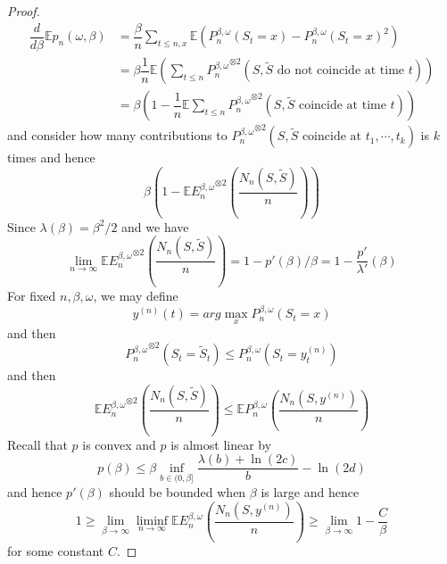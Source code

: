 \begin{proof}
    \[
    \begin{aligned}
    \dfrac{d}{d\beta}\mathbb{E}p_n(\omega,\beta) &= \dfrac{\beta}{n} \sum\limits_{t\leq n, x} \mathbb{E}(P_n^{\beta,\omega}(S_t = x)-P_n^{\beta,\omega}(S_t = x)^2) \\
    &=\beta\dfrac{1}{n}\mathbb{E}(\sum\limits_{t\leq n} {P_n^{\beta,\omega}}^{\otimes 2}(S,\tilde{S}\text{ do not coincide at time }t)) \\
    & = \beta(1 - \dfrac{1}{n}\mathbb{E}\sum\limits_{t\leq n}{ P_n^{\beta,\omega}}^{\otimes 2}(S,\tilde{S}\text{ coincide at time }t))   
    \end{aligned}
    \]
    and consider how many contributions to ${P_n^{\beta,\omega}}^{\otimes 2}(S,\tilde{S}\text{ coincide at }t_1,\cdots,t_k)$ is $k$ times and hence
    \[
    \beta\left(1 - \mathbb{E}{ E_n^{\beta,\omega}}^{\otimes 2}\left(\dfrac{N_n(S,\tilde{S})}{n}\right)\right)
    \]
    Since $\lambda(\beta) = \beta^2/2$ and we have
    \[
    \lim_{n\to\infty}\mathbb{E}{E_n^{\beta,\omega}}^{\otimes 2}\left(\dfrac{N_n(S,\tilde{S})}{n}\right) = 1 - p'(\beta)/\beta = 1 -\dfrac{p'}{\lambda '}(\beta)
    \]
    For fixed $n,\beta,\omega$, we may define
    \[
    y^{(n)}(t) = arg\max_{x} P_n^{\beta,\omega}(S_t = x)
    \]
    and then
    \[
    {P_n^{\beta,\omega}}^{\otimes 2}(S_t = \tilde{S}_t) \leq P_n^{\beta,\omega}(S_t = y_t^{(n)})
    \]
    and then
    \[
    \mathbb{E}{E_n^{\beta,\omega}}^{\otimes 2}\left(\dfrac{N_n(S,\tilde{S})}{n}\right) \leq \mathbb{E}P_n^{\beta,\omega}\left(\dfrac{N_n(S,y^{(n)})}{n}\right)
    \]
    Recall that $p$ is convex and $p$ is almost linear by
    \[
    p(\beta) \leq \beta\inf_{b\in(0,\beta]}\dfrac{\lambda(b)+\ln(2c)}{b} - \ln(2d)
    \]
    and hence $p'(\beta)$ should be bounded when $\beta$ is large and hence
    \[
    1\geq \lim_{\beta\to\infty} \liminf_{n\to\infty} \mathbb{E}E_n^{\beta,\omega}\left(\dfrac{N_n(S,y^{(n)})}{n}\right) \geq \lim_{\beta\to \infty} 1 - \dfrac{C}{\beta}
    \]
    for some constant $C$.
\end{proof}

